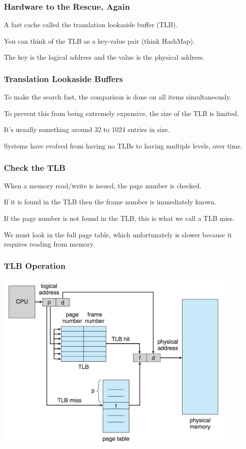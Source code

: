 \begin{frame}
\frametitle{Hardware to the Rescue, Again}

A fast cache called the \alert{translation lookaside buffer} (TLB). 

You can think of the TLB as a key-value pair (think HashMap). 

The key is the logical address and the value is the physical address. 

\end{frame}

\begin{frame}
\frametitle{Translation Lookaside Buffers}

To make the search fast, the comparison is done on all items simultaneously. 

To prevent this from being extremely expensive, the size of the TLB is limited.

It's usually something around 32 to 1024 entries in size. 

Systems have evolved from having no TLBs to having multiple levels, over time.

\end{frame}


\begin{frame}
\frametitle{Check the TLB}

When a memory read/write is issued, the page number is checked.

If it is found in the TLB then the frame number is immediately known. 

If the page number is not found in the TLB, this is what we call a \alert{TLB miss}.

We must look in the full page table, which unfortunately is slower because it requires reading from memory.

\end{frame}

\begin{frame}
\frametitle{TLB Operation}

\begin{center}
\includegraphics[width=0.9\textwidth]{images/tlb-hardware.png}
\end{center}


\end{frame}

